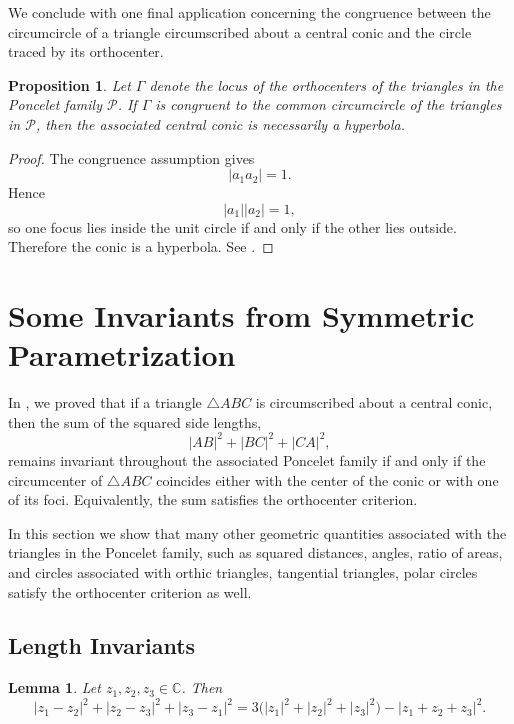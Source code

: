 \documentclass[11pt,reqno]{amsart}
\newtheorem{lemma}{Lemma}[section]
\newtheorem{proposition}{Proposition}[section]
\theoremstyle{definition}
\numberwithin{equation}{section}
\begin{document}
We conclude with one final application concerning the congruence between the circumcircle of a triangle circumscribed about a central conic and the circle traced by its orthocenter.

\begin{proposition}
Let $\Gamma$ denote the locus of the orthocenters of the triangles in the Poncelet family $\mathcal P$. If $\Gamma$ is congruent to the common circumcircle of the triangles in $\mathcal P$, then the associated central conic is necessarily a hyperbola.
\end{proposition}

\begin{proof}
The congruence assumption gives
\[
|a_1a_2|=1.
\]
Hence
\[
|a_1||a_2|=1,
\]
so one focus lies inside the unit circle if and only if the other lies
outside. Therefore the conic is a hyperbola. See \cite[Theorem 2.2]{Dragovic-Murad2026}.
\end{proof}

\section{Some Invariants from Symmetric Parametrization}\label{sec:invsympar}

In \cite{Dragovic-Murad2026}, we proved that if a triangle $\triangle ABC$ is circumscribed about a central conic, then the sum of the squared side lengths,
\[
|AB|^{2}+|BC|^{2}+|CA|^{2},
\]
remains invariant throughout the associated Poncelet family if and only if the circumcenter of $\triangle ABC$ coincides either with the center of the conic or with one of its foci. Equivalently, the sum satisfies the orthocenter criterion.

In this section we show that many other geometric quantities associated with the triangles in the Poncelet family, such as squared distances, angles, ratio of areas, and circles associated with orthic triangles, tangential triangles, polar circles satisfy the orthocenter criterion as well.

\subsection{Length Invariants}\label{sec:lenghtinv}

\begin{lemma}
Let $z_1,z_2,z_3\in\mathbb C$. Then
\begin{equation}\label{eq:z1z2z3id}
|z_1-z_2|^2+|z_2-z_3|^2+|z_3-z_1|^2
=
3\bigl(|z_1|^2+|z_2|^2+|z_3|^2\bigr)
-|z_1+z_2+z_3|^2.
\end{equation}
\end{lemma}
\end{document}
